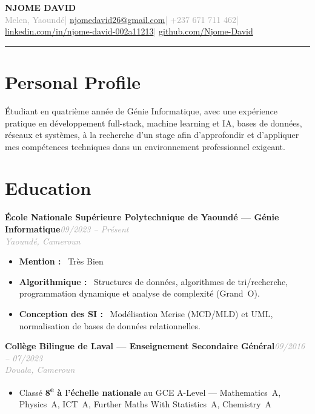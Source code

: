 \documentclass[10pt, a4paper]{article}
\newcommand{\entryhead}[2]{%
  \noindent\textbf{#1}\hfill{\small\textit{\textcolor{darkgray}{#2}}}\\[-4pt]%
}
\newcommand{\entrysub}[1]{%
  {\small\textit{\textcolor{darkgray}{#1}}}\\[2pt]%
}
\newcommand{\blabel}[1]{\textbf{#1}\ }
\begin{document}

{\LARGE\bfseries\color{navyblue} NJOME DAVID}\\[4pt]
{\small\textcolor{darkgray}{%
  Melen, Yaoundé\quad|\quad
  \href{mailto:njomedavid26@gmail.com}{njomedavid26@gmail.com}\quad|\quad
  +237 671 711 462\quad|\quad
  \href{https://www.linkedin.com/in/njome-david-002a11213}{linkedin.com/in/njome-david-002a11213}\quad|\quad
  \href{https://github.com/Njome-David}{github.com/Njome-David}
}}

\vspace{4pt}
\textcolor{navyblue}{\rule{\linewidth}{1.8pt}}
\vspace{2pt}

\section{Personal Profile}

Étudiant en quatrième année de Génie Informatique, avec une expérience pratique en développement
full-stack, machine learning et IA, bases de données, réseaux et systèmes, à la recherche d'un stage afin d'approfondir et d'appliquer
mes compétences techniques dans un environnement professionnel exigeant.

\section{Education}

\entryhead{École Nationale Supérieure Polytechnique de Yaoundé — Génie Informatique}{09/2023 -- Présent}
\entrysub{Yaoundé, Cameroun}
\begin{itemize}
  \item \blabel{Mention :} Très Bien
  \item \blabel{Algorithmique :} Structures de données, algorithmes de tri/recherche, programmation
        dynamique et analyse de complexité (Grand~O).
  \item \blabel{Conception des SI :} Modélisation Merise (MCD/MLD) et UML, normalisation de bases
        de données relationnelles.
\end{itemize}

\entryhead{Collège Bilingue de Laval — Enseignement Secondaire Général}{09/2016 -- 07/2023}
\entrysub{Douala, Cameroun}
\begin{itemize}
  \item Classé \textbf{8\textsuperscript{e} à l'échelle nationale} au GCE A-Level —
        Mathematics~A, Physics~A, ICT~A, Further Maths With Statistics~A, Chemistry~A
\end{itemize}
\end{document}
